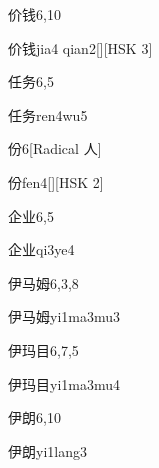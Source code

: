 \begin{entry}{价钱}{6,10}
  \begin{phonetics}{价钱}{jia4 qian2}[][HSK 3]
  \end{phonetics}
\end{entry}

\begin{entry}{任务}{6,5}
  \begin{phonetics}{任务}{ren4wu5}
  \end{phonetics}
\end{entry}

\begin{entry}{份}{6}[Radical 人]
  \begin{phonetics}{份}{fen4}[][HSK 2]
  \end{phonetics}
\end{entry}

\begin{entry}{企业}{6,5}
  \begin{phonetics}{企业}{qi3ye4}
  \end{phonetics}
\end{entry}

\begin{entry}{伊马姆}{6,3,8}
  \begin{phonetics}{伊马姆}{yi1ma3mu3}
  \end{phonetics}
\end{entry}

\begin{entry}{伊玛目}{6,7,5}
  \begin{phonetics}{伊玛目}{yi1ma3mu4}
  \end{phonetics}
\end{entry}

\begin{entry}{伊朗}{6,10}
  \begin{phonetics}{伊朗}{yi1lang3}
  \end{phonetics}
\end{entry}

